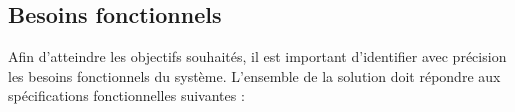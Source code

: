 



\subsection{Besoins fonctionnels}
Afin d’atteindre les objectifs souhaités, il est important d’identifier avec 
précision les besoins fonctionnels du système. 
L’ensemble de la solution doit 
répondre aux spécifications fonctionnelles suivantes :
\\
